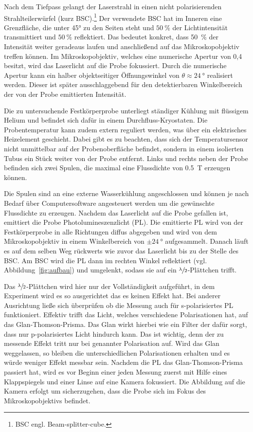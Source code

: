 Nach dem Tiefpass gelangt der Laserstrahl in einen 
nicht polarisierenden Strahlteilerwürfel (kurz BSC).\footnote{BSC engl. Beam-splitter-cube.}
Der verwendete BSC hat im Inneren eine Grenzfläche, die unter 45° zu den Seiten 
steht und $\SI{50}{\percent}$ der Lichtintensität transmittiert und $\SI{50}{\percent}$ reflektiert.
Das bedeutet konkret, dass 
\SI{50}{\percent} der Intensität weiter geradeaus laufen und anschließend auf das Mikroskopobjektiv 
treffen können. Im Mikroskopobjektiv, welches eine numerische Apertur von 0,4 besitzt, wird 
das Laserlicht auf die Probe fokussiert. Durch die numerische Apertur kann ein
halber objektseitiger Öffnungswinkel von $\theta \approx \SI{24}{\degree}$ realisiert werden. 
Dieser ist später ausschlaggebend für den detektierbaren Winkelbereich der von der Probe emittierten
Intensität. 

Die zu untersuchende Festkörperprobe unterliegt ständiger Kühlung mit flüssigem Helium und befindet
sich dafür in einem  Durchfluss-Kryostaten. Die Probentemperatur kann zudem extern reguliert werden, was
über  ein elektrisches Heizelement geschieht.
Dabei gibt es zu beachten, dass sich der Temperatursensor nicht unmittelbar auf der 
Probenoberfläche befindet, sondern in einem isolierten Tubus ein Stück weiter von der Probe entfernt.
Links und rechts neben der Probe befinden sich zwei Spulen, die maximal eine Flussdichte von
\SI{0.5}{\tesla} erzeugen können. 

Die Spulen sind an eine externe Wasserkühlung angeschlossen und können je nach Bedarf 
über Computersoftware angesteuert werden um die gewünschte Flussdichte zu erzeugen. 
Nachdem das Laserlicht auf die Probe gefallen ist, emittiert die Probe Photolumineszenzlicht (PL).
Die emittierte PL wird von der Festkörperprobe in alle Richtungen diffus abgegeben und 
wird von dem Mikroskopobjektiv in einem Winkelbereich von $\pm \SI{24}{\degree}$ aufgesammelt. 
Danach läuft es auf dem selben Weg rückwerts wie zuvor das Laserlicht bis zu der Stelle des BSC.
Am BSC wird die PL dann im rechten Winkel reflektiert (vgl. Abbildung~\ref{fig:aufbau}) und umgelenkt, sodass sie 
auf ein $\sfrac{\lambda}{2}$-Plättchen trifft.

Das $\sfrac{\lambda}{2}$-Plättchen wird hier nur der Vollständigkeit aufgeführt, in dem Experiment
wird es so ausgerichtet das es keinen Effekt hat. 
Bei anderer Ausrichtung ließe sich überprüfen ob die Messung auch für s-polarisiertes PL
funktioniert.
Effektiv trifft das Licht, welches verschiedene Polarisationen hat, auf das Glan-Thomson-Prisma.
Das Glan wirkt hierbei wie ein Filter der dafür sorgt, dass nur p-polarisiertes Licht hindurch kann.
Das ist wichtig, denn der zu messende Effekt tritt nur bei genannter Polarisation auf.
Wird das Glan weggelassen, so bleiben die unterschiedlichen Polarisationen erhalten
und es würde weniger Effekt messbar sein. 
Nachdem die PL das Glan-Thomson-Prisma passiert hat, wird es vor Beginn einer jeden Messung zuerst
mit Hilfe eines Klappspiegels und einer Linse auf eine Kamera fokussiert. 
Die Abbildung auf die Kamera erfolgt um sicherzugehen, dass die Probe sich im Fokus des 
Mikroskopobjektivs befindet.


